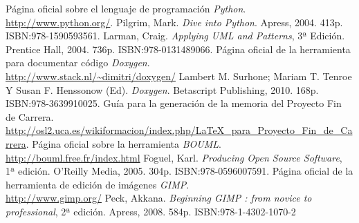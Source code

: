 

\begin{thebibliography}{99}
Página oficial sobre el lenguaje de programación \emph{Python}.\\ \url{http://www.python.org/}.
Pilgrim, Mark. \emph{Dive into Python}. Apress, 2004. 413p. ISBN:978-1590593561.
Larman, Craig. \emph{Applying UML and Patterns}, 3ª Edición. Prentice Hall, 2004. 736p. ISBN:978-0131489066.
Página oficial de la herramienta para documentar código \emph{Doxygen}.\\ \url{http://www.stack.nl/~dimitri/doxygen/}
Lambert M. Surhone; Mariam T. Tenroe Y Susan F. Henssonow (Ed). \emph{Doxygen}. Betascript Publishing, 2010. 168p. ISBN:978-3639910025.  
Guía para la generación de la memoria del Proyecto Fin de Carrera.\\ \url{http://osl2.uca.es/wikiformacion/index.php/LaTeX_para_Proyecto_Fin_de_Carrera}.
Página oficial sobre la herramienta \emph{BOUML}.\\ \url{http://bouml.free.fr/index.html}
Foguel, Karl. \emph{Producing Open Source Software}, 1ª edición. O'Reilly Media, 2005. 304p. ISBN:978-0596007591.
Página oficial de la herramienta de edición de imágenes \emph{GIMP}.\\ \url{http://www.gimp.org/}
Peck, Akkana. \emph{Beginning GIMP : from novice to professional}, 2ª edición. Apress, 2008. 584p. ISBN:978-1-4302-1070-2
\end{thebibliography}
